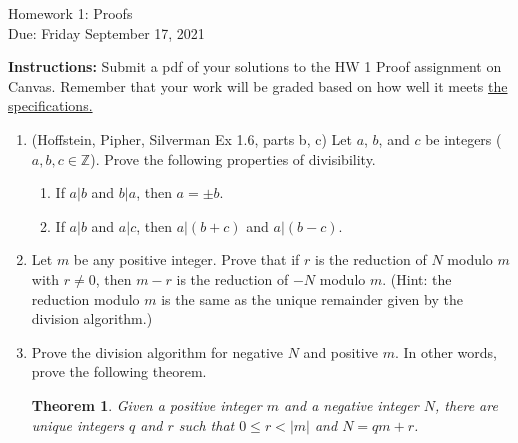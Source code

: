 \documentclass[12pt]{article}
\newcommand{\Z}{\mathbb{Z}}
\newtheorem*{theorem}{Theorem}
\begin{document}
\begin{center}
{\Large Homework 1: Proofs}\\
Due: Friday September 17, 2021\\


\end{center}
{\bf Instructions:} Submit a pdf of your solutions to the HW 1 Proof assignment on Canvas. Remember that your work will be graded based on how well it meets \href{https://docs.google.com/document/d/1emM06_WRh_h941rsjtRE9fRVndJtfRKd9gyS3Fs_rFA/edit?usp=sharing}{the specifications. }

\begin{enumerate}


\item (Hoffstein, Pipher, Silverman Ex 1.6, parts b, c) Let $a$, $b$, and $c$ be integers ($a,b,c\in \Z$). Prove the following properties of divisibility.
\begin{enumerate}
\item If $a|b$ and $b|a$, then $a=\pm b$.
\item If $a|b$ and $a|c$, then $a|(b+c)$ and $a|(b-c)$. 
\end{enumerate} 
\item Let $m$ be any positive integer. Prove that  if $r$ is the reduction of $N$ modulo $m$ with $r\ne 0$, then $m-r$ is the reduction of $-N$ modulo $m$. (Hint: the reduction modulo $m$ is the same as the unique remainder given by the division algorithm.)
\item Prove the division algorithm for negative $N$ and positive $m$.  In other words, prove the following theorem. 
\begin{theorem}
Given a positive integer $m$ and a negative integer $N$, there are unique integers $q$ and $r$ such that $0\le r<|m|$ and $N=qm+r$. 
\end{theorem}
\end{enumerate}
\end{document}
